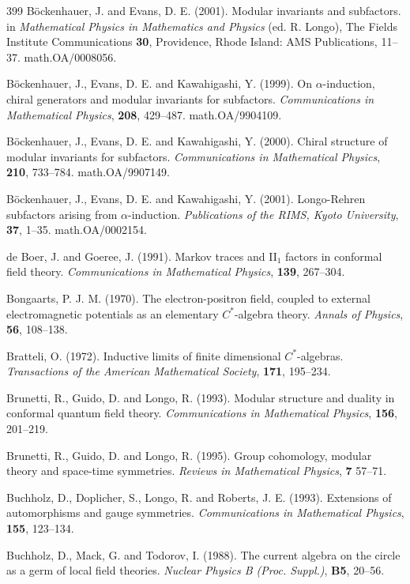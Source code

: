 \documentclass[12pt]{article}
\theoremstyle{plain}
\theoremstyle{definition}
\numberwithin{equation}{section}
\begin{document}
\begin{thebibliography} {399}
B\"ockenhauer, J. and Evans, D. E. (2001).
Modular invariants and subfactors.
in {\em Mathematical Physics in Mathematics and Physics} (ed. R. Longo),
The Fields Institute Communications {\bf 30}, Providence, Rhode Island:
AMS Publications, 11--37.
math.OA/0008056.

B\"ockenhauer, J., Evans, D. E. and Kawahigashi, Y. (1999).
On $\alpha$-induction, chiral generators
and modular invariants for subfactors.
{\em Communications in Mathematical Physics}, {\bf 208}, 429--487.
math.OA/9904109.

B\"ockenhauer, J., Evans, D. E. and Kawahigashi, Y. (2000).
Chiral structure of modular invariants for subfactors.
{\em Communications in Mathematical Physics}, {\bf 210}, 733--784.
math.OA/9907149.

B\"ockenhauer, J., Evans, D. E. and Kawahigashi, Y. (2001).
Longo-Rehren subfactors arising from $\alpha$-induction.
{\em Publications of the RIMS, Kyoto University}, {\bf 37}, 1--35.
math.OA/0002154.

de Boer, J. and Goeree, J. (1991).
Markov traces and II$_1$ factors in
conformal field theory.
{\em Communications in Mathematical Physics},
{\bf 139}, 267--304.

Bongaarts, P. J. M. (1970).
The electron-positron field, coupled to external 
electromagnetic potentials as an elementary
$C^*$-algebra theory. {\em Annals of Physics},
{\bf 56}, 108--138.

Bratteli, O. (1972).
Inductive limits of finite dimensional $C^*$-algebras.
{\em Transactions of the American Mathematical Society},
{\bf 171}, 195--234.

Brunetti, R., Guido, D. and Longo, R. (1993).
Modular structure and duality in conformal
quantum field theory. 
{\em Communications in Mathematical Physics},  {\bf 156}, 201--219.

Brunetti, R., Guido, D. and Longo, R. (1995).
Group cohomology, modular theory and space-time symmetries. 
{\em Reviews in Mathematical Physics}, {\bf 7} 57--71.

Buchholz, D., Doplicher, S., Longo, R. and Roberts, J. E. (1993).
Extensions of automorphisms and gauge symmetries.
{\em Communications in Mathematical Physics},
{\bf 155}, 123--134.

Buchholz, D., Mack, G. and Todorov, I. (1988).
The current algebra on the circle as a germ of local field theories.
{\em Nuclear  Physics B (Proc. Suppl.)}, {\bf B5}, 20--56.


\end{thebibliography}
\end{document}
